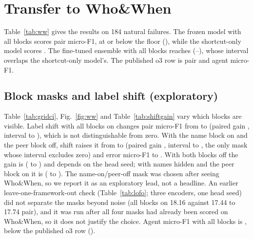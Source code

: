 \documentclass[conference]{IEEEtran}
\begin{document}


\section{Transfer to Who\&When}\label{sec:ww}
Table~\ref{tab:ww} gives the results on 184 natural failures. The frozen model with all blocks scores \wwFullPair{} pair micro-F1, at or below the floor (\floorWW), while the shortcut-only model scores \wwShortPair. The fine-tuned ensemble with all blocks reaches \wwAllNo{} (\wwAllNoLo--\wwAllNoHi), whose interval overlaps the shortcut-only model's. The published o3 row is \pubOthreeWW{} pair and \pubOthreeWWagent{} agent micro-F1.

\subsection{Block masks and label shift (exploratory)}
Table~\ref{tab:gridci}, Fig.~\ref{fig:ww} and Table~\ref{tab:shiftgain} vary which blocks are visible. Label shift with all blocks on changes pair micro-F1 from \wwAllNo{} to \wwAllShift{} (paired gain \sgDdOO{}, interval \sgDdOOLo{} to \sgDdOOHi{}), which is not distinguishable from zero. With the name block on and the peer block off, shift raises it from \wwNameNo{} to \wwNameShift{} (paired gain \sgDdOF{}, interval \sgDdOFLo{} to \sgDdOFHi{}, the only mask whose interval excludes zero) and error micro-F1 to \wwNameShiftErr. With both blocks off the gain is \sgDdFF{} (\sgDdFFLo{} to \sgDdFFHi{}) and depends on the head seed; with names hidden and the peer block on it is \sgDdFO{} (\sgDdFOLo{} to \sgDdFOHi{}). The name-on/peer-off mask was chosen after seeing Who\&When, so we report it as an exploratory lead, not a headline. An earlier leave-one-framework-out check (Table~\ref{tab:lofo}; three encoders, one head seed) did not separate the masks beyond noise (all blocks on 18.16 against 17.44 to 17.74 pair), and it was run after all four masks had already been scored on Who\&When, so it does not justify the choice. Agent micro-F1 with all blocks is \wwAllAgent, below the published o3 row (\pubOthreeWWagent).


\end{document}

